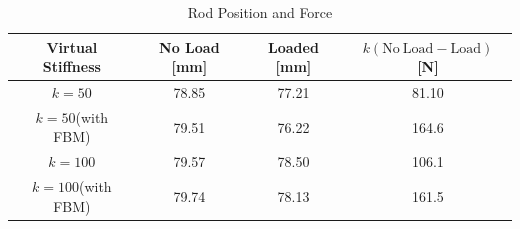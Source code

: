 \begin{table}[t]
    \caption{Rod Position and Force}
    \label{tab:position}
    \centering
    \begin{tabular}{cccc}
    Virtual Stiffness&No Load [mm] &Loaded [mm] &$k(\mathrm{No~Load} - \mathrm{Load})$ [N]\\ \hline
        $k=50$&78.85&77.21&81.10\\
        $k=50$(with FBM)&79.51&76.22&164.6\\
        $k=100$&79.57&78.50&106.1\\
        $k=100$(with FBM)&79.74&78.13&161.5\\ \hline
    \end{tabular}
\end{table}
